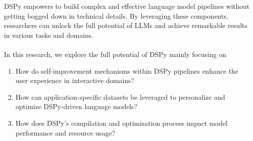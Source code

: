 DSPy empowers to build complex and effective language model pipelines without getting bogged down in technical details. By leveraging these components, researchers can unlock the full potential of LLMs and achieve remarkable results in various tasks and domains.\\
\\
In this research, we explore the full potential of DSPy mainly focusing on
\begin{enumerate}
    \item How do self-improvement mechanisms within DSPy pipelines enhance the user experience in interactive domains?
    \item How can application-specific datasets be leveraged to personalize and optimize DSPy-driven language models?
    \item How does DSPy's compilation and optimization process impact model performance and resource usage?
\end{enumerate}

